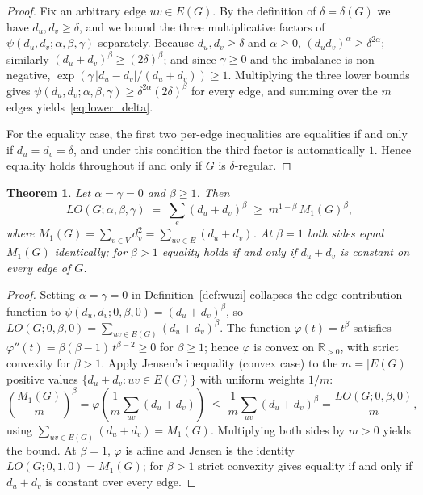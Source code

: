 \documentclass[a5paper, 10pt]{article}
\theoremstyle{plain}
\newtheorem{theorem}{Theorem}
\theoremstyle{remark}
\theoremstyle{definition}
\newcommand{\Wuzi}{LO(G;\alpha,\beta,\gamma)}
\begin{document}
  \begin{proof}
  Fix an arbitrary edge $uv \in E(G)$. By the definition of
  $\delta = \delta(G)$ we have $d_u, d_v \ge \delta$, and we bound
  the three multiplicative factors of
  $\psi(d_u, d_v; \alpha, \beta, \gamma)$ separately. Because
  $d_u, d_v \ge \delta$ and $\alpha \ge 0$, $(d_u d_v)^{\alpha} \ge
  \delta^{2\alpha}$; similarly $(d_u + d_v)^{\beta} \ge (2\delta)^{\beta}$;
  and since $\gamma \ge 0$ and the imbalance is non-negative,
  $\exp(\gamma\,|d_u - d_v|/(d_u + d_v)) \ge 1$. Multiplying the three
  lower bounds gives $\psi(d_u, d_v; \alpha, \beta, \gamma) \ge
  \delta^{2\alpha}(2\delta)^{\beta}$ for every edge, and summing over
  the $m$ edges yields~\eqref{eq:lower_delta}.

  For the equality case, the first two per-edge inequalities are
  equalities if and only if $d_u = d_v = \delta$, and under this
  condition the third factor is automatically $1$. Hence equality
  holds throughout if and only if $G$ is $\delta$-regular.
  \end{proof}

  \begin{theorem}\label{thm:m1_bound}
  Let $\alpha = \gamma = 0$ and $\beta \ge 1$. Then
  \[
  \Wuzi
  \;=\; \sum_e (d_u + d_v)^{\beta}
  \;\ge\; m^{1 - \beta}\, M_1(G)^{\beta},
  \]
  where $M_1(G) = \sum_{v \in V} d_v^2 = \sum_{uv \in E}(d_u + d_v)$.
  At $\beta = 1$ both sides equal $M_1(G)$ identically; for
  $\beta > 1$ equality holds if and only if $d_u + d_v$ is constant
  on every edge of $G$.
  \end{theorem}

  \begin{proof}
  Setting $\alpha = \gamma = 0$ in Definition~\ref{def:wuzi}
  collapses the edge-contribution function to
  $\psi(d_u, d_v; 0, \beta, 0) = (d_u + d_v)^{\beta}$, so
  $LO(G; 0, \beta, 0) = \sum_{uv \in E(G)} (d_u + d_v)^{\beta}$.
  The function $\varphi(t) = t^{\beta}$ satisfies
  $\varphi''(t) = \beta(\beta - 1)\, t^{\beta - 2} \ge 0$ for
  $\beta \ge 1$; hence $\varphi$ is convex on
  $\mathbb{R}_{> 0}$, with strict convexity for $\beta > 1$. Apply
  Jensen's inequality (convex case) to the $m = |E(G)|$ positive
  values $\{d_u + d_v : uv \in E(G)\}$ with uniform weights $1/m$:
  \[
  \left(\frac{M_1(G)}{m}\right)^{\!\beta}
  = \varphi\!\left(\frac{1}{m}\sum_{uv} (d_u + d_v)\right)
  \;\le\;
  \frac{1}{m}\sum_{uv} (d_u + d_v)^{\beta}
  = \frac{LO(G; 0, \beta, 0)}{m},
  \]
  using $\sum_{uv \in E(G)} (d_u + d_v) = M_1(G)$. Multiplying both
  sides by $m > 0$ yields the bound. At $\beta = 1$, $\varphi$ is
  affine and Jensen is the identity $LO(G; 0, 1, 0) = M_1(G)$; for
  $\beta > 1$ strict convexity gives equality if and only if
  $d_u + d_v$ is constant over every edge.
  \end{proof}
\end{document}
